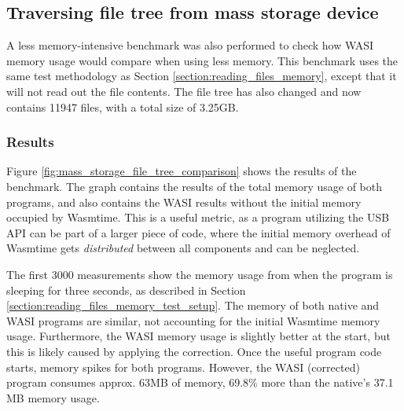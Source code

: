 \subsection{Traversing file tree from mass storage device}
\label{section:travering_file_tree_memory}
A less memory-intensive benchmark was also performed to check how \acrshort{WASI} memory usage would compare when using less memory. This benchmark uses the same test methodology as Section \ref{section:reading_files_memory}, except that it will not read out the file contents. The file tree has also changed and now contains 11947 files, with a total size of 3.25GB.

\subsubsection{Results}

Figure \ref{fig:mass_storage_file_tree_comparison} shows the results of the benchmark. The graph contains the results of the total memory usage of both programs, and also contains the \acrshort{WASI} results without the initial memory occupied by Wasmtime. This is a useful metric, as a program utilizing the \acrshort{USB} \acrshort{API} can be part of a larger piece of code, where the initial memory overhead of Wasmtime gets \textit{distributed} between all components and can be neglected.

The first 3000 measurements show the memory usage from when the program is sleeping for three seconds, as described in Section \ref{section:reading_files_memory_test_setup}. The memory of both native and \acrshort{WASI} programs are similar, not accounting for the initial Wasmtime memory usage. Furthermore, the \acrshort{WASI} memory usage is slightly better at the start, but this is likely caused by applying the correction. Once the useful program code starts, memory spikes for both programs. However, the \acrshort{WASI} (corrected) program consumes approx. 63MB of memory, 69.8\% more than the native's 37.1 MB memory usage.

